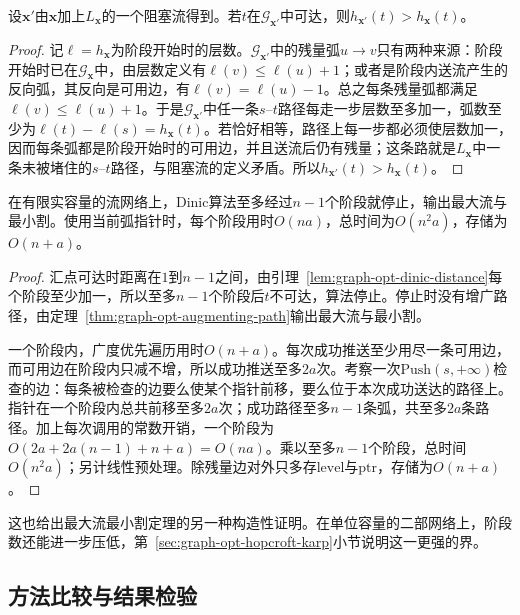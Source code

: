 \begin{lemma}[阶段距离严格增加]
\label{lem:graph-opt-dinic-distance}
设$\bm x'$由$\bm x$加上$L_{\bm x}$的一个阻塞流得到。若$t$在$\mathcal G_{\bm x'}$中可达，则$h_{\bm x'}(t)>h_{\bm x}(t)$。
\end{lemma}

\begin{proof}
记$\ell=h_{\bm x}$为阶段开始时的层数。$\mathcal G_{\bm x'}$中的残量弧$u\to v$只有两种来源：阶段开始时已在$\mathcal G_{\bm x}$中，由层数定义有$\ell(v)\leq\ell(u)+1$；或者是阶段内送流产生的反向弧，其反向是可用边，有$\ell(v)=\ell(u)-1$。总之每条残量弧都满足$\ell(v)\leq\ell(u)+1$。于是$\mathcal G_{\bm x'}$中任一条$s$--$t$路径每走一步层数至多加一，弧数至少为$\ell(t)-\ell(s)=h_{\bm x}(t)$。若恰好相等，路径上每一步都必须使层数加一，因而每条弧都是阶段开始时的可用边，并且送流后仍有残量；这条路就是$L_{\bm x}$中一条未被堵住的$s$--$t$路径，与阻塞流的定义矛盾。所以$h_{\bm x'}(t)>h_{\bm x}(t)$。
\end{proof}

\begin{theorem}[Dinic算法的正确性与开销]
\label{thm:graph-opt-dinic}
在有限实容量的流网络上，Dinic算法至多经过$n-1$个阶段就停止，输出最大流与最小割。使用当前弧指针时，每个阶段用时$O(na)$，总时间为$O(n^2a)$，存储为$O(n+a)$。
\end{theorem}

\begin{proof}
汇点可达时距离在$1$到$n-1$之间，由引理~\ref{lem:graph-opt-dinic-distance}每个阶段至少加一，所以至多$n-1$个阶段后$t$不可达，算法停止。停止时没有增广路径，由定理~\ref{thm:graph-opt-augmenting-path}输出最大流与最小割。

一个阶段内，广度优先遍历用时$O(n+a)$。每次成功推送至少用尽一条可用边，而可用边在阶段内只减不增，所以成功推送至多$2a$次。考察一次$\mathrm{Push}(s,+\infty)$检查的边：每条被检查的边要么使某个指针前移，要么位于本次成功送达的路径上。指针在一个阶段内总共前移至多$2a$次；成功路径至多$n-1$条弧，共至多$2a$条路径。加上每次调用的常数开销，一个阶段为$O(2a+2a(n-1)+n+a)=O(na)$。乘以至多$n-1$个阶段，总时间$O(n^2a)$；另计线性预处理。除残量边对外只多存$\mathrm{level}$与$\mathrm{ptr}$，存储为$O(n+a)$。
\end{proof}

这也给出最大流最小割定理的另一种构造性证明。在单位容量的二部网络上，阶段数还能进一步压低，第~\ref{sec:graph-opt-hopcroft-karp}小节说明这一更强的界。

\subsection{方法比较与结果检验}
\label{sec:graph-opt-max-flow-analysis}

